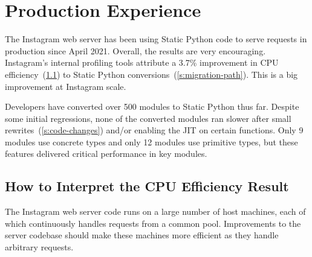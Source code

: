 \documentclass[english,cleveref,submission]{programming}
\newcommand{\SP}{Static Python}
\newcommand{\CPUchange}{3.7\%}
\begin{document}
\section{Production Experience}
\label{s:eval}




The Instagram web server has been using \SP{} code to serve requests in
production since April 2021.
Overall, the results are very encouraging.
Instagram's internal profiling tools attribute a \CPUchange{} improvement
in CPU efficiency~(\cref{s:what-is-cpu}) to \SP{} conversions~(\cref{s:migration-path}).
This is a big improvement at Instagram scale.

Developers have converted over 500 modules to \SP{} thus far.
Despite some initial regressions, none of the converted modules
ran slower after small rewrites~(\cref{s:code-changes})
and/or enabling the JIT on certain functions.
Only 9 modules use concrete types and only 12 modules use primitive types,
but these features delivered critical performance in key modules.



\subsection{How to Interpret the CPU Efficiency Result}
\label{s:what-is-cpu}

The Instagram web server code runs on a large number of host machines, each of
which continuously handles requests from a common pool.
Improvements to the server codebase should make these machines more efficient
as they handle arbitrary requests.
\end{document}
